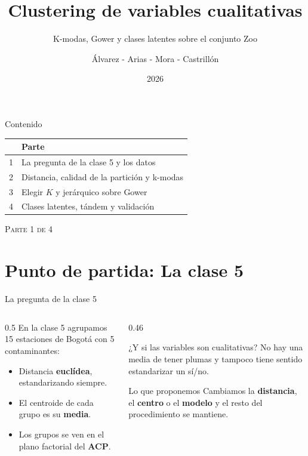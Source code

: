 \documentclass[aspectratio=169]{beamer}
\title[Clustering cualitativo]{Clustering de variables cualitativas}
\subtitle{K-modas, Gower y clases latentes sobre el conjunto Zoo}
\author{Álvarez - Arias - Mora - Castrillón}
\institute{Análisis Estadístico de Datos - Universidad del Rosario}
\date{2026}
\newcommand{\parte}[2]{%
  \begin{frame}[plain]
    \centering\vfill
    {\usebeamercolor[fg]{frametitle}\color{mcmPrimary}\Large\textsc{Parte #1 de 4}}\par
    \vspace{0.6em}{\LARGE #2}\par\vfill
  \end{frame}}
\begin{document}
\begin{frame}[plain]
  \titlepage
\end{frame}

\begin{frame}{Contenido}
  \centering\small
  \begin{tabular}{@{}cl@{}}
    \toprule
    & Parte \\
    \midrule
    1 & La pregunta de la clase 5 y los datos \\
    2 & Distancia, calidad de la partición y k-modas \\
    3 & Elegir $K$ y jerárquico sobre Gower \\
    4 & Clases latentes, tándem y validación \\
    \bottomrule
  \end{tabular}
\end{frame}

\parte{1}{La pregunta de la clase 5 y los datos}

\section{Punto de partida: La clase 5}

\begin{frame}{La pregunta de la clase 5}
  \begin{columns}[c]
    \begin{column}{0.5\textwidth}
      En la clase 5 agrupamos 15 estaciones de Bogotá con 5 contaminantes:
      \begin{itemize}
        \item Distancia \textbf{euclídea}, estandarizando siempre.
        \item El centroide de cada grupo es su \textbf{media}.
        \item Los grupos se ven en el plano factorial del \textbf{ACP}.
      \end{itemize}
    \end{column}
    \begin{column}{0.46\textwidth}
      \begin{alertblock}{¿Y si las variables son cualitativas?}
        No hay una media de tener plumas y tampoco tiene sentido
        estandarizar un sí/no.
      \end{alertblock}
      \begin{block}{Lo que proponemos}
        Cambiamos la \textbf{distancia}, el \textbf{centro} o el
        \textbf{modelo} y el resto del procedimiento se mantiene.
      \end{block}
    \end{column}
  \end{columns}
\end{frame}
\end{document}
